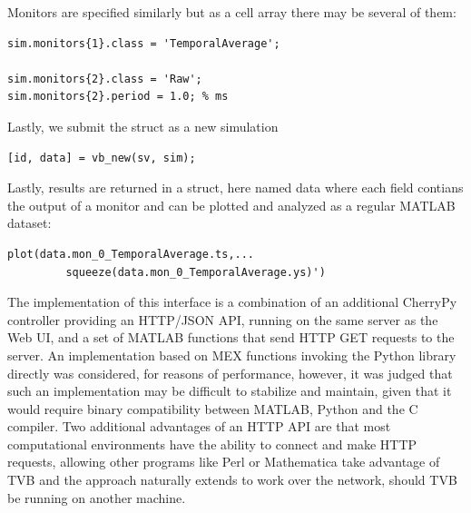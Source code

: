 Monitors are specified similarly but as a cell array there may be
several of them:

\begin{lstlisting}
sim.monitors{1}.class = 'TemporalAverage';

sim.monitors{2}.class = 'Raw';
sim.monitors{2}.period = 1.0; % ms
\end{lstlisting}


Lastly, we submit the struct as a new simulation

\begin{lstlisting}
[id, data] = vb_new(sv, sim);
\end{lstlisting}

\noindent Lastly, results are returned in a struct, here named data
where each field contians the output of a monitor and can be plotted
and analyzed as a regular MATLAB dataset:

\begin{lstlisting}
plot(data.mon_0_TemporalAverage.ts,...
		 squeeze(data.mon_0_TemporalAverage.ys)')
\end{lstlisting}

The implementation of this interface is a combination of an additional
CherryPy controller providing an HTTP/JSON API, running on the same 
server as the Web UI, and a set of MATLAB functions that send HTTP 
GET requests to the server. An implementation based on MEX functions 
invoking the Python library directly was considered, for reasons of 
performance, however, it was judged that such an implementation may be
difficult to stabilize and maintain, given that it would require binary
compatibility between MATLAB, Python and the C compiler. Two additional 
advantages of an HTTP API are that most computational environments have
the ability to connect and make HTTP requests, allowing other programs 
like Perl or Mathematica take advantage of TVB and the approach naturally
extends to work over the network, should TVB be running on another machine.
